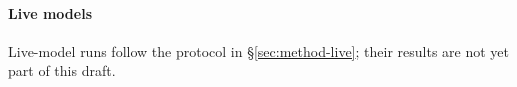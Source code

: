\paragraph{Live models} Live-model runs follow the protocol in \S\ref{sec:method-live}; their results are not yet part of this draft.
